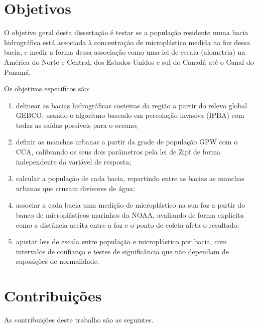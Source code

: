 \section{Objetivos}
\label{sec:objetivos}

O objetivo geral desta dissertação é testar se a população residente numa bacia hidrográfica está associada à concentração de microplástico medida na foz dessa bacia, e medir a forma dessa associação como uma lei de escala (alometria) na América do Norte e Central, dos Estados Unidos e sul do Canadá até o Canal do Panamá.

Os objetivos específicos são:

\begin{enumerate}
	\item delinear as bacias hidrográficas costeiras da região a partir do relevo global \gls{GEBCO}, usando o algoritmo baseado em percolação invasiva (\acrshort{IPBA}) com todas as saídas possíveis para o oceano;
	\item definir as manchas urbanas a partir da grade de população \gls{GPW} com o \gls{CCA}, calibrando os seus dois parâmetros pela lei de Zipf de forma independente da variável de resposta;
	\item calcular a população de cada bacia, repartindo entre as bacias as manchas urbanas que cruzam divisores de água;
	\item associar a cada bacia uma medição de microplástico na sua foz a partir do banco de microplásticos marinhos da \gls{NOAA}, avaliando de forma explícita como a distância aceita entre a foz e o ponto de coleta afeta o resultado;
	\item ajustar leis de escala entre população e microplástico por bacia, com intervalos de confiança e testes de significância que não dependam de suposições de normalidade.
\end{enumerate}

\section{Contribuições}
\label{sec:contribuicoes}

As contribuições deste trabalho são as seguintes.

